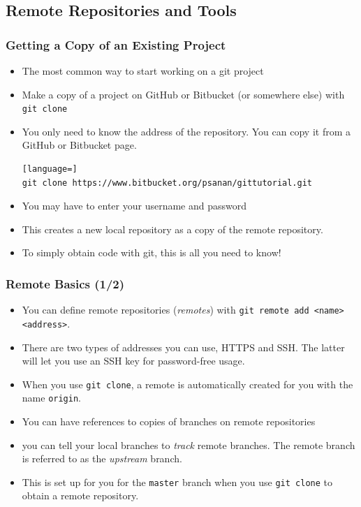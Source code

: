 \documentclass{beamer}
\begin{document}
\subsection{Remote Repositories and Tools}

\begin{frame}[fragile]
\frametitle{Getting a Copy of an Existing Project}
\begin{itemize}
\item
The most common way to start working on a git project
\item Make a copy of a project on GitHub or Bitbucket (or somewhere else) with \lstinline{git clone}
\item You only need to know the address of the repository. You can copy it from a GitHub or Bitbucket page.
\begin{lstlisting}[language=]
git clone https://www.bitbucket.org/psanan/gittutorial.git
\end{lstlisting}
\item You may have to enter your username and password
\item This creates a new local repository as a copy of the remote repository.
\item To simply obtain code with git, this is all you need to know!
\end{itemize}
\end{frame}

\begin{frame}[fragile]
\frametitle{Remote Basics (1/2)}
\begin{itemize}
\item
You can define remote repositories (\emph{remotes}) with \lstinline{git remote add <name> <address>}.
\item There are two types of addresses you can use, HTTPS and SSH. The latter will let you use an SSH key for password-free usage.
\item When you use \lstinline{git clone}, a remote is automatically created for you with the name \texttt{origin}.
\item You can have references to copies of branches on remote repositories
\item you can tell your local branches to \emph{track} remote branches. The remote branch is referred to as the \emph{upstream} branch.
\item This is set up for you for the \lstinline{master} branch when you use \lstinline{git clone} to obtain a remote repository.
\end{itemize}
\end{frame}
\end{document}
